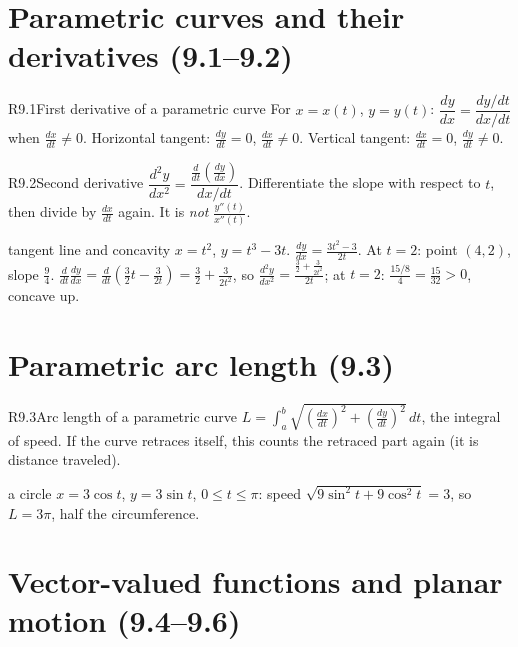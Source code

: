 \documentclass{apcalc}
\begin{document}
\section{Parametric curves and their derivatives (9.1--9.2)}

\begin{rulebox}{R9.1}{First derivative of a parametric curve}
For $x=x(t)$, $y=y(t)$: $\dfrac{dy}{dx}=\dfrac{dy/dt}{dx/dt}$ when $\frac{dx}{dt}\neq0$. Horizontal tangent: $\frac{dy}{dt}=0$, $\frac{dx}{dt}\neq0$. Vertical tangent: $\frac{dx}{dt}=0$, $\frac{dy}{dt}\neq0$.
\end{rulebox}

\begin{rulebox}{R9.2}{Second derivative}
$\dfrac{d^2y}{dx^2}=\dfrac{\frac{d}{dt}\left(\frac{dy}{dx}\right)}{dx/dt}$. Differentiate the slope with respect to $t$, then divide by $\frac{dx}{dt}$ again. It is \emph{not} $\frac{y''(t)}{x''(t)}$.
\end{rulebox}

\begin{example}{tangent line and concavity}
$x=t^2$, $y=t^3-3t$. $\frac{dy}{dx}=\frac{3t^2-3}{2t}$. At $t=2$: point $(4,2)$, slope $\frac94$. $\frac{d}{dt}\frac{dy}{dx}=\frac{d}{dt}\left(\frac32t-\frac{3}{2t}\right)=\frac32+\frac{3}{2t^2}$, so $\frac{d^2y}{dx^2}=\frac{\frac32+\frac{3}{2t^2}}{2t}$; at $t=2$: $\frac{15/8}{4}=\frac{15}{32}>0$, concave up. 
\end{example}

\section{Parametric arc length (9.3)}

\begin{rulebox}{R9.3}{Arc length of a parametric curve}
$L=\displaystyle\int_a^b\sqrt{\left(\frac{dx}{dt}\right)^2+\left(\frac{dy}{dt}\right)^2}\,dt$, the integral of speed. If the curve retraces itself, this counts the retraced part again (it is distance traveled).
\end{rulebox}

\begin{example}{a circle}
$x=3\cos t$, $y=3\sin t$, $0\le t\le\pi$: speed $\sqrt{9\sin^2t+9\cos^2t}=3$, so $L=3\pi$, half the circumference.
\end{example}

\section{Vector-valued functions and planar motion (9.4--9.6)}
\end{document}
